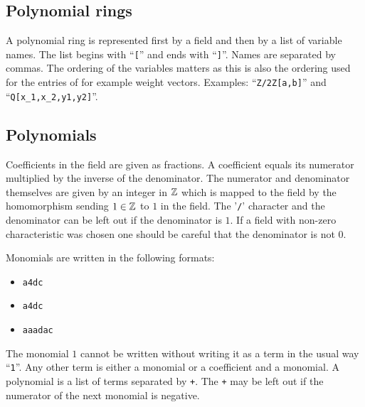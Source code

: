 \subsection{Polynomial rings}
A polynomial ring is represented first by a field and then by a list of
variable names.  The list begins with ``\texttt{[}'' and ends with
``\texttt{]}''. Names are separated by commas. The ordering of the
variables matters as this is also the ordering used for the entries of
for example weight vectors. Examples: ``\texttt{Z/2Z[a,b]}'' and ``\texttt{Q[x\_1,x\_2,y1,y2]}''.
\subsection{Polynomials}

Coefficients in the field are given as fractions. A coefficient equals
its numerator multiplied by the inverse of the denominator. The
numerator and denominator themselves are given by an integer in $\mathbb{Z}$
which is mapped to the field by the homomorphism sending $1\in\mathbb{Z}$ to
$1$ in the field. The '{\tt /}' character and the denominator can be
left out if the denominator is $1$. If a field with non-zero
characteristic was chosen one should be careful that the denominator
is not $0$.

Monomials are written in the following formats:
\begin{itemize}
\item
\texttt{a4dc}
\item
\texttt{a4dc}
\item
\texttt{aaadac}
\end{itemize}
The monomial $1$ cannot be written without writing it as a term in the usual way ``\texttt{1}''.
Any other term is either a monomial or a coefficient and a monomial. A polynomial is a list of terms separated by {\tt +}. The {\tt +} may be left out if the numerator of the next monomial is negative.

